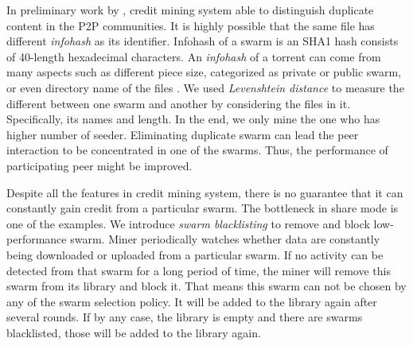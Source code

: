 In preliminary work by \citeauthor{2015:creditmining:capota}, credit mining system able to distinguish duplicate content in the P2P communities. It is highly possible that the same file has different \textit{infohash} as its identifier. Infohash of a swarm is an SHA1 hash consists of 40-length hexadecimal characters. An \textit{infohash} of a torrent can come from many aspects such as different piece size, categorized as private or public swarm, or even directory name of the files \cite{2015:creditmining:capota}. We used \textit{Levenshtein distance} to measure the different between one swarm and another by considering the files in it. Specifically, its names and length. In the end, we only mine the one who has higher number of seeder. Eliminating duplicate swarm can lead the peer interaction to be concentrated in one of the swarms. Thus, the performance of participating peer might be improved.

Despite all the features in credit mining system, there is no guarantee that it can constantly gain credit from a particular swarm. The bottleneck in share mode is one of the examples. We introduce \textit{swarm blacklisting} to remove and block low-performance swarm. Miner periodically watches whether data are constantly being downloaded or uploaded from a particular swarm. If no activity can be detected from that swarm for a long period of time, the miner will remove this swarm from its library and block it. That means this swarm can not be chosen by any of the swarm selection policy. It will be added to the library again after several rounds. If by any case, the library is empty and there are swarms blacklisted, those will be added to the library again.

